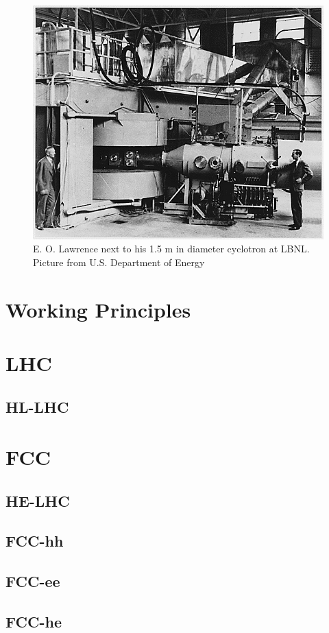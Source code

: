 \begin{figure}
	\centering
  \begin{minipage}{\textwidth}
  	\centering
   	\includegraphics[width=.49\textwidth]{Pictures/cyclo3}
  		\caption{\label{fig:lawrence}
   			E. O. Lawrence next to his 1.5 m in diameter cyclotron
                        at LBNL.
                      \footnotesize{Picture from U.S. Department of Energy}}
  \end{minipage}
\end{figure}


\section{Working Principles}

\section{LHC}
\subsection{HL-LHC}
\section{FCC}
\subsection{HE-LHC}
\subsection{FCC-hh}
\subsection{FCC-ee}
\subsection{FCC-he}
